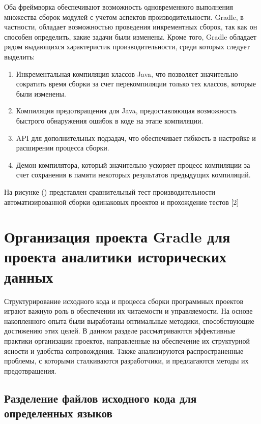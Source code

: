 Оба фреймворка обеспечивают возможность одновременного выполнения множества сборок модулей с учетом
аспектов производительности.
Gradle, в частности, обладает возможностью проведения инкрементных
сборок, так как он способен определить, какие задачи были изменены.
Кроме того, Gradle обладает
рядом выдающихся характеристик производительности, среди которых следует выделить:
\begin{enumerate}
    \item  Инкрементальная компиляция классов Java, что позволяет значительно сократить время сборки за счет
    перекомпиляции только тех классов, которые были изменены.

    \item Компиляция предотвращения для Java, предоставляющая возможность быстрого обнаружения ошибок в
    коде на этапе компиляции.

    \item API для дополнительных подзадач, что обеспечивает гибкость в настройке и расширении процесса
    сборки.

    \item Демон компилятора, который значительно ускоряет процесс компиляции за счет сохранения в памяти
    некоторых результатов предыдущих компиляций.
\end{enumerate}


На рисунке () представлен сравнительный тест производительности автоматизированной сборки
одинаковых проектов и прохождение тестов [2]


\section{Организация проекта Gradle для проекта аналитики исторических данных}\label{sec:--gradle-----}

Структурирование исходного кода и процесса сборки программных проектов играют важную роль в
обеспечении их читаемости и управляемости.
На основе накопленного опыта были выработаны оптимальные
методики, способствующие достижению этих целей.
В данном разделе рассматриваются эффективные
практики организации проектов, направленные на обеспечение их структурной ясности и удобства
сопровождения.
Также анализируются распространенные проблемы, с которыми сталкиваются разработчики,
и предлагаются методы их предотвращения.

\subsection{Разделение файлов исходного кода для определенных языков}\label{subsec:------}

